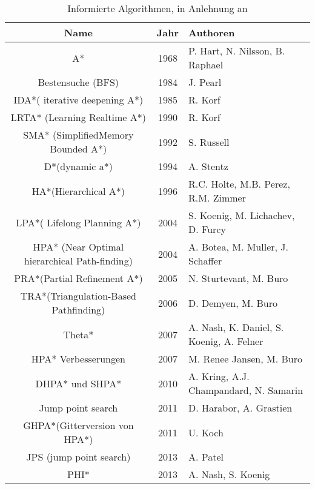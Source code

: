 \begin{table}[H]
	\begin{tabularx}{\linewidth}{|c|c|X|}
		\hline
		\textbf{Name}                                          & \textbf{Jahr} & \textbf{Authoren}                                 \\ \hline
		A*                                            & 1968 & P. Hart, N. Nilsson, B. Raphael          \\ \hline
		Bestensuche (BFS)                            & 1984 & J. Pearl                                 \\ \hline
		IDA*( iterative deepening A*)                 & 1985 & R. Korf                                  \\ \hline
		LRTA* (Learning Realtime A*)                  & 1990 & R. Korf                                  \\ \hline
		SMA* (SimplifiedMemory Bounded A*)            & 1992 & S. Russell                               \\ \hline
		D*(dynamic a*)                                & 1994 & A. Stentz                                \\ \hline
		HA*(Hierarchical A*)                          & 1996 & R.C. Holte, M.B. Perez, R.M. Zimmer      \\ \hline
		LPA*( Lifelong Planning A*)                   & 2004 & S. Koenig, M. Lichachev, D. Furcy        \\ \hline
		HPA* (Near Optimal hierarchical Path-finding) & 2004 & A. Botea, M. Muller, J. Schaffer         \\ \hline
		PRA*(Partial Refinement A*)                   & 2005 & N. Sturtevant, M. Buro                   \\ \hline
		TRA*(Triangulation-Based Pathfinding)         & 2006 & D. Demyen, M. Buro                       \\ \hline
		Theta*                                        & 2007 & A. Nash, K. Daniel, S. Koenig, A. Felner \\ \hline
		HPA* Verbesserungen                           & 2007 & M. Renee Jansen, M. Buro                 \\ \hline
		DHPA* und SHPA*                               & 2010 & A. Kring, A.J. Champandard, N. Samarin   \\ \hline
		Jump point search                             & 2011 & D. Harabor, A. Grastien                  \\ \hline
		GHPA*(Gitterversion von HPA*)                 & 2011 & U. Koch                                  \\ \hline
		JPS (jump point search)                       & 2013 & A. Patel                                 \\ \hline
		PHI*                                          & 2013 & A. Nash, S. Koenig                       \\ \hline
	\end{tabularx}
\caption{\label{tab:informed}Informierte Algorithmen, in Anlehnung an \cite[S. 233]{Noo15}}
\end{table}

